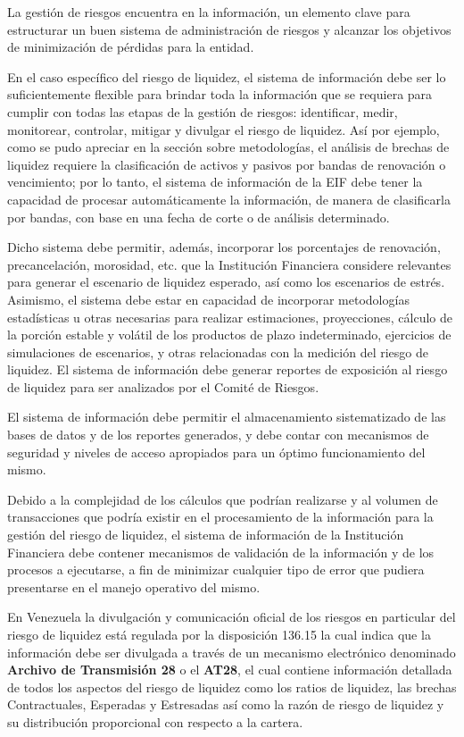 \documentclass[]{article}
\begin{document}
La gestión de riesgos encuentra en la información, un elemento clave
para estructurar un buen sistema de administración de riesgos y alcanzar
los objetivos de minimización de pérdidas para la entidad.

En el caso específico del riesgo de liquidez, el sistema de información
debe ser lo suficientemente flexible para brindar toda la información
que se requiera para cumplir con todas las etapas de la gestión de
riesgos: identificar, medir, monitorear, controlar, mitigar y divulgar
el riesgo de liquidez. Así por ejemplo, como se pudo apreciar en la
sección sobre metodologías, el análisis de brechas de liquidez requiere
la clasificación de activos y pasivos por bandas de renovación o
vencimiento; por lo tanto, el sistema de información de la EIF debe
tener la capacidad de procesar automáticamente la información, de manera
de clasificarla por bandas, con base en una fecha de corte o de análisis
determinado.

Dicho sistema debe permitir, además, incorporar los porcentajes de
renovación, precancelación, morosidad, etc. que la Institución
Financiera considere relevantes para generar el escenario de liquidez
esperado, así como los escenarios de estrés. Asimismo, el sistema debe
estar en capacidad de incorporar metodologías estadísticas u otras
necesarias para realizar estimaciones, proyecciones, cálculo de la
porción estable y volátil de los productos de plazo indeterminado,
ejercicios de simulaciones de escenarios, y otras relacionadas con la
medición del riesgo de liquidez. El sistema de información debe generar
reportes de exposición al riesgo de liquidez para ser analizados por el
Comité de Riesgos.

El sistema de información debe permitir el almacenamiento sistematizado
de las bases de datos y de los reportes generados, y debe contar con
mecanismos de seguridad y niveles de acceso apropiados para un óptimo
funcionamiento del mismo.

Debido a la complejidad de los cálculos que podrían realizarse y al
volumen de transacciones que podría existir en el procesamiento de la
información para la gestión del riesgo de liquidez, el sistema de
información de la Institución Financiera debe contener mecanismos de
validación de la información y de los procesos a ejecutarse, a fin de
minimizar cualquier tipo de error que pudiera presentarse en el manejo
operativo del mismo.

En Venezuela la divulgación y comunicación oficial de los riesgos en
particular del riesgo de liquidez está regulada por la disposición
136.15 la cual indica que la información debe ser divulgada a través de
un mecanismo electrónico denominado \textbf{Archivo de Transmisión 28} o
el \textbf{AT28}, el cual contiene información detallada de todos los
aspectos del riesgo de liquidez como los ratios de liquidez, las brechas
Contractuales, Esperadas y Estresadas así como la razón de riesgo de
liquidez y su distribución proporcional con respecto a la cartera.
\end{document}
